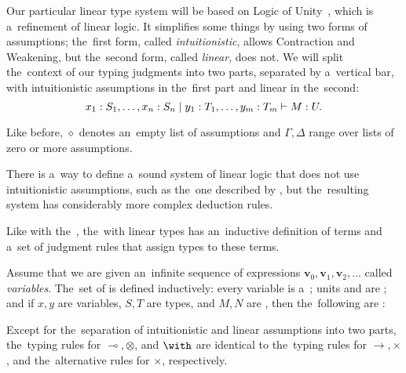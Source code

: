 
Our particular linear type system will be based on Logic of
Unity~\citep{girard_1993}, which is a~refinement of linear logic. It simplifies
some things by using two forms of assumptions; the~first form, called
\emph{intuitionistic}, allows Contraction and Weakening, but the~second form,
called \emph{linear}, does not. We will split the~context of our typing
judgments into two parts, separated by a~vertical bar, with intuitionistic
assumptions in the~first part and linear in the~second:
\[
  x_1 \overset{}: S_1, \dotsc, x_n \overset{}: S_n \mid y_1 \overset{}: T_1, \dotsc, y_m \overset{}: T_m
    \vdash M \overset{}: U.
\]

Like before, $\diamond$ denotes an~empty list of assumptions and $\Gamma,
\Delta$ range over lists of zero or more assumptions.

There is a~way to define a~sound system of linear logic that does not use
intuitionistic assumptions, such as the~one described by
\citet{benton_et_al_1993}, but the~resulting system has considerably more
complex deduction rules.

Like with the~, the~\lc with linear types has an~inductive
definition of terms and a~set of judgment rules that assign types to these
terms.

\begin{definition}
  Assume that we are given an~infinite sequence of expressions $\mathbf{v}_0,
  \mathbf{v}_1, \mathbf{v}_2, \dots$ called \emph{variables}. The~set of
  \emph{\lts} is defined inductively: every variable is a~\lt; units \munit
  and \aunit are \lts; and if $x, y$ are variables, $S, T$ are types, and $M, N$
  are \lts, then the~following are \lts:
\end{definition}

\label{sec:ltlc}

Except for the~separation of intuitionistic and linear assumptions into two
parts, the~typing rules for $\multimap, \otimes$, and $\with$ are identical to
the~typing rules for $\to, \times$, and the~alternative rules for $\times$,
respectively.

